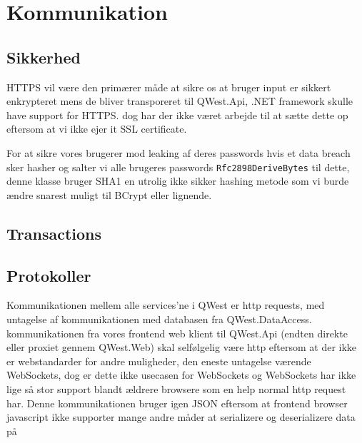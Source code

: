\chapter{Kommunikation}\label{ch:communication}


\section{Sikkerhed}\label{sec:security}
HTTPS vil være den primærer måde at sikre os at bruger input er sikkert enkrypteret mens de bliver transporeret til QWest.Api, .NET framework skulle have support for HTTPS. \cite{DotNetFrameworkSSL} dog har der ikke været arbejde til at sætte dette op eftersom at vi ikke ejer it SSL certificate.

For at sikre vores brugerer mod leaking af deres passwords hvis et data breach sker hasher og salter vi alle brugeres passwords \texttt{Rfc2898DeriveBytes} \cite{Rfc2898DeriveBytes} til dette, denne klasse bruger SHA1 en utrolig ikke sikker hashing metode som vi burde ændre snarest muligt \cite{HowsecureisSHA1} til BCrypt \cite{BCrypt} eller lignende.

\section{Transactions}\label{sec:transactions}


\section{Protokoller}\label{sec:protocols}
Kommunikationen mellem alle services'ne i QWest er http requests, med untagelse af kommunikationen med databasen fra QWest.DataAccess. kommunikationen fra vores frontend web klient til QWest.Api (endten direkte eller proxiet gennem QWest.Web) skal selfølgelig være http eftersom at der ikke er webstandarder for andre muligheder, den eneste untagelse værende WebSockets, dog er dette ikke usecasen for WebSockets og WebSockets har ikke lige så stor support blandt ældrere browsere som en help normal http request har. Denne kommunikationen bruger igen JSON eftersom at frontend browser javascript ikke supporter mange andre måder at serializere og deserializere data på

